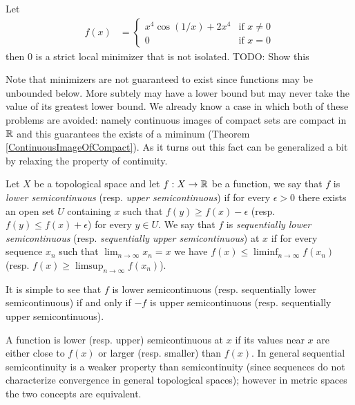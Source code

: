\begin{examp}Let 
\begin{align*}
f(x) &= \begin{cases}
x^4 \cos(1/x) + 2x^4 & \text{if $x \neq 0$} \\
0 & \text{if $x = 0$}
\end{cases}
\end{align*}
then $0$ is a strict local minimizer that is not isolated.  TODO: Show this
\end{examp}

Note that minimizers are not guaranteed to exist since functions may
be unbounded below.  More subtely may have a lower bound but may never
take the value of its greatest lower bound.  We already know a case in
which both of these problems are avoided: namely continuous images of
compact sets are compact in $\mathbb{R}$ and this guarantees the exists of
a miminum (Theorem \ref{ContinuousImageOfCompact}).  As it turns out
this fact can be generalized a bit by relaxing the property of
continuity.

\begin{defn}Let $X$ be a topological space and let $f : X \to \mathbb{R}$
  be a function, we say that $f$ is \emph{lower semicontinuous}
  (resp. \emph{upper semicontinuous}) if for every
  $\epsilon > 0$ there exists an open set $U$ containing $x$ such that
  $f(y) \geq f(x) - \epsilon$ (resp. $f(y) \leq f(x) + \epsilon$) for
  every $y \in U$. We say that $f$ is \emph{sequentially lower
    semicontinuous} (resp. \emph{sequentially upper semicontinuous})
  at $x$ if for every sequence $x_n$ such that $\lim_{n \to \infty}
  x_n = x$ we have $f(x) \leq \liminf_{n \to \infty} f(x_n)$ (resp. $f(x) \geq \limsup_{n \to \infty} f(x_n)$).
\end{defn}

It is simple to see that $f$ is lower semicontinuous
(resp. sequentially lower semicontinuous) if and only if $-f$ is upper
semicontinuous (resp. sequentially upper semicontinuous).

A function is lower (resp. upper) semicontinuous at $x$ if its values near $x$ are
either close to $f(x)$ or larger (resp. smaller) than $f(x)$.  In
general sequential semicontinuity is a weaker property than
semicontinuity (since sequences do not characterize convergence in
general topological spaces); however in metric spaces the two concepts
are equivalent.

